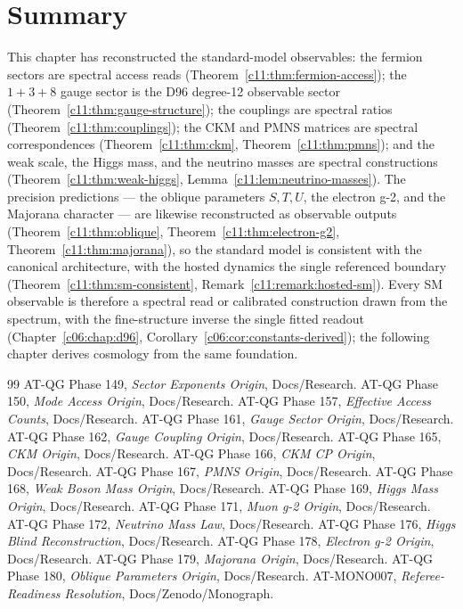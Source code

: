 \section{Summary}
\label{c11:sec:sm-summary}

This chapter has reconstructed the standard-model observables: the fermion sectors are
spectral access reads (Theorem~\ref{c11:thm:fermion-access}); the $1+3+8$ gauge sector is
the D96 degree-12 observable sector (Theorem~\ref{c11:thm:gauge-structure}); the couplings
are spectral ratios (Theorem~\ref{c11:thm:couplings}); the CKM and PMNS matrices are
spectral correspondences (Theorem~\ref{c11:thm:ckm}, Theorem~\ref{c11:thm:pmns}); and the
weak scale, the Higgs mass, and the neutrino masses are spectral constructions
(Theorem~\ref{c11:thm:weak-higgs}, Lemma~\ref{c11:lem:neutrino-masses}). The precision
predictions --- the oblique parameters $S,T,U$, the electron g-2, and the Majorana
character --- are likewise reconstructed as observable outputs
(Theorem~\ref{c11:thm:oblique}, Theorem~\ref{c11:thm:electron-g2},
Theorem~\ref{c11:thm:majorana}), so the standard model is consistent with the canonical
architecture, with the hosted dynamics the single referenced boundary
(Theorem~\ref{c11:thm:sm-consistent}, Remark~\ref{c11:remark:hosted-sm}). Every SM
observable is therefore a spectral read or calibrated construction drawn from the
spectrum, with the fine-structure inverse the single fitted readout
(Chapter~\ref{c06:chap:d96}, Corollary~\ref{c06:cor:constants-derived}); the following
chapter derives cosmology from the same foundation.

\begin{thebibliography}{99}
 AT-QG Phase 149, \emph{Sector Exponents Origin}, Docs/Research.
 AT-QG Phase 150, \emph{Mode Access Origin}, Docs/Research.
 AT-QG Phase 157, \emph{Effective Access Counts}, Docs/Research.
 AT-QG Phase 161, \emph{Gauge Sector Origin}, Docs/Research.
 AT-QG Phase 162, \emph{Gauge Coupling Origin}, Docs/Research.
 AT-QG Phase 165, \emph{CKM Origin}, Docs/Research.
 AT-QG Phase 166, \emph{CKM CP Origin}, Docs/Research.
 AT-QG Phase 167, \emph{PMNS Origin}, Docs/Research.
 AT-QG Phase 168, \emph{Weak Boson Mass Origin}, Docs/Research.
 AT-QG Phase 169, \emph{Higgs Mass Origin}, Docs/Research.
 AT-QG Phase 171, \emph{Muon g-2 Origin}, Docs/Research.
 AT-QG Phase 172, \emph{Neutrino Mass Law}, Docs/Research.
 AT-QG Phase 176, \emph{Higgs Blind Reconstruction}, Docs/Research.
 AT-QG Phase 178, \emph{Electron g-2 Origin}, Docs/Research.
 AT-QG Phase 179, \emph{Majorana Origin}, Docs/Research.
 AT-QG Phase 180, \emph{Oblique Parameters Origin}, Docs/Research.
 AT-MONO007, \emph{Referee-Readiness Resolution}, Docs/Zenodo/Monograph.
\end{thebibliography}
